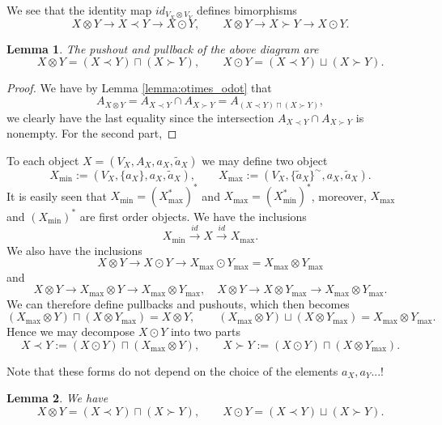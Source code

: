 \documentclass[12pt]{article}
\newtheorem{lemma}{Lemma}
\theoremstyle{definition}
\theoremstyle{remark}
\begin{document}
We see that  the identity map $id_{V_X\otimes V_Y}$ defines bimorphisms
\[
X\otimes Y \to X\prec Y\to X\odot Y,\qquad X\otimes Y\to X\succ Y\to X\odot Y.
\]

\begin{lemma}\label{lemma:precsucc_pushpul} The  pushout and pullback of the above
diagram are
\[
X\otimes Y=(X\prec Y)\sqcap (X\succ Y),\qquad X\odot Y= (X\prec Y)\sqcup (X\succ Y).
\]

\end{lemma}

\begin{proof}  We have by Lemma \ref{lemma:otimes_odot} that 
\[
A_{X\otimes Y}=A_{X\prec Y}\cap A_{X\succ Y}=A_{(X\prec Y)\sqcap (X\succ Y)},
\]
we clearly have the last equality since the intersection $A_{X\prec Y}\cap A_{X\succ Y}$
is nonempty. For the second part,   


\end{proof}





To each object $X=(V_X,A_X,a_X,\tilde a_X)$ we may define two object
\[
X_{\min}:=(V_X,\{a_X\},a_X,\tilde a_X),\qquad X_{\max}:=(V_X,\{\tilde a_X\}^\sim,a_X,\tilde a_X). 
\]
It is easily seen that $X_{\min}=(X^*_{\max})^*$ and $X_{\max}=(X^*_{\min})^*$, moreover,
$X_{\max}$ and $(X_{\min})^*$ are first order objects. We have the inclusions
\[
X_{\min}\xrightarrow{id} X\xrightarrow{id} X_{\max}.
\]
We also have the inclusions
\[
X\otimes Y\to X\odot Y \to X_{\max}\odot Y_{\max}=X_{\max}\otimes Y_{\max}
\]
and
\[
X\otimes Y \to X_{\max}\otimes Y\to X_{\max}\otimes Y_{\max}, \quad X\otimes Y \to X\otimes Y_{\max}\to X_{\max}\otimes Y_{\max}.
\]
We can therefore define pullbacks and pushouts,  which then becomes
\[
(X_{\max}\otimes Y)\sqcap (X\otimes Y_{\max})=X\otimes Y,\qquad (X_{\max}\otimes Y)\sqcup
(X\otimes Y_{\max})=X_{\max}\otimes Y_{\max}.
\]
Hence we may decompose $X\odot Y$ into two parts
\[
X\prec Y:= (X\odot Y)\sqcap (X_{\max}\otimes Y),\qquad X\succ Y:=(X\odot Y) \sqcap
(X\otimes  Y_{\max}).
\]



Note that these forms do not depend on the choice of the elements $a_X,a_Y$...!

\begin{lemma}\label{lemma:decomp} We have
\[
X\otimes Y=(X\prec Y) \sqcap (X\succ Y),\qquad X\odot Y= (X\prec Y)\sqcup (X\succ Y).
\]

\end{lemma}
\end{document}
